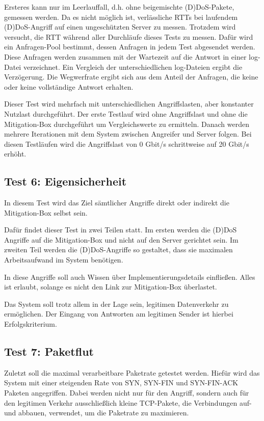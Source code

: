 \documentclass[../review_1.tex]{subfiles}
\begin{document}
Ersteres kann nur im Leerlauffall, d.h. ohne beigemischte (D)DoS-Pakete, gemessen werden. Da es nicht möglich ist, verlässliche RTTs bei laufendem (D)DoS-Angriff auf einen ungeschützten Server zu messen. Trotzdem wird versucht, die RTT während aller Durchläufe dieses Tests zu messen. Dafür wird ein Anfragen-Pool bestimmt, dessen Anfragen in jedem Test abgesendet werden. Diese Anfragen werden zusammen mit der Wartezeit auf die Antwort in einer log-Datei verzeichnet. Ein Vergleich der unterschiedlichen log-Dateien ergibt die Verzögerung. Die Wegwerfrate ergibt sich aus dem Anteil der Anfragen, die keine oder keine vollständige Antwort erhalten.

Dieser Test wird mehrfach mit unterschiedlichen Angriffslasten, aber konstanter Nutzlast durchgeführt. Der erste Testlauf wird ohne Angriffslast und ohne die Mitigation-Box durchgeführt um Vergleichswerte zu ermitteln. Danach werden mehrere Iterationen mit dem System zwischen Angreifer und Server folgen. Bei diesen Testläufen wird die Angriffslast von 0 Gbit/s schrittweise auf 20 Gbit/s erhöht.

\subsection{Test 6: Eigensicherheit}
In diesem Test wird das Ziel sämtlicher Angriffe direkt oder indirekt die Mitigation-Box selbst sein.

Dafür findet dieser Test in zwei Teilen statt. Im ersten werden die (D)DoS Angriffe auf die Mitigation-Box und nicht auf den Server gerichtet sein. Im zweiten Teil werden die (D)DoS-Angriffe so gestaltet, dass sie maximalen Arbeitsaufwand im System benötigen.

In diese Angriffe soll auch Wissen über Implementierungsdetails einfließen. Alles ist erlaubt, solange es nicht den Link zur Mitigation-Box überlastet.

Das System soll trotz allem in der Lage sein, legitimen Datenverkehr zu ermöglichen. Der Eingang von Antworten am legitimen Sender ist hierbei Erfolgskriterium.

\subsection{Test 7: Paketflut}
Zuletzt soll die maximal verarbeitbare Paketrate getestet werden. Hiefür wird das System mit einer steigenden Rate von SYN, SYN-FIN und SYN-FIN-ACK Paketen angegriffen. Dabei werden nicht nur für den Angriff, sondern auch für den legitimen Verkehr ausschließlich kleine TCP-Pakete, die Verbindungen auf- und abbauen, verwendet, um die Paketrate zu maximieren.
\end{document}

